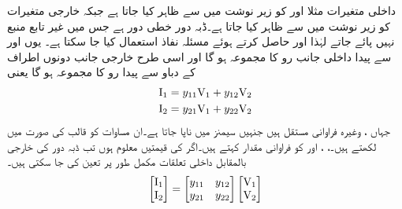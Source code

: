  داخلی متغیرات مثلا  اور  کو زیر نوشت میں  سے ظاہر کیا جاتا ہے  جبکہ خارجی متغیرات کو زیر نوشت میں  سے ظاہر کیا جاتا ہے۔ڈبہ دور خطی دور ہے جس میں غیر تابع منبع نہیں پائے جاتے لہٰذا  اور  حاصل کرتے ہوئے مسئلہ نفاذ استعمال کیا جا سکتا ہے۔ یوں  اور  سے پیدا داخلی جانب رو کا مجموعہ  ہو گا اور اسی طرح خارجی جانب دونوں اطراف کے دباو سے پیدا رو کا مجموعہ  ہو گا یعنی
\begin{gather}
\begin{aligned}\label{مساوات_نمونہ_الف}
{\ensuremath{{\textup{I}}}}_1&=y_{11}{{\textup{V}}}_1+y_{12}{{\textup{V}}}_2\\
{{\textup{I}}}_2&=y_{21}{{\textup{V}}}_1+y_{22}{{\textup{V}}}_2
\end{aligned}
\end{gather}  
جہاں ،  وغیرہ فراوانی مستقل ہیں جنہیں سیمنز  میں ناپا جاتا ہے۔ان مساوات کو قالب کی صورت میں لکھتے ہیں۔، ،  اور  کو فراوانی مقدار  کہتے ہیں۔اگر  کی قیمتیں معلوم ہوں تب ڈبہ دور کی خارجی بالمقابل داخلی تعلقات مکمل طور پر تعین کی جا سکتی ہیں۔ 
\begin{align}\label{مساوات_نمونہ_ب}
\begin{bmatrix}
{\ensuremath{{\textup{I}}}}_1 \\
{{\textup{I}}}_2
\end{bmatrix}
=
\begin{bmatrix}
y_{11} & y_{12}\\
y_{21} & y_{22}
\end{bmatrix}
\begin{bmatrix}
{\ensuremath{{\textup{V}}}}_1\\
{{\textup{V}}}_2
\end{bmatrix}
\end{align}

